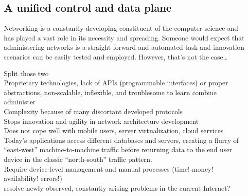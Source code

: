 \newpage
\subsection{A unified control and data plane}
Networking is a constantly developing constituent of the computer science and has played a vast role in its necessity and spreading.
Someone would expect that administering networks is a straight-forward and automated task and innovation scenarios can be easily tested and employed.
However, that's not the case\ldots \\
\indent 


Split those two
\\Proprietary technologies, lack of APIs (programmable interfaces) or proper abstractions, non-scalable, inflexible, and troublesome to learn combine administer
\\Complexity because of many discortant developed protocols
\\Stops innovation and agility in network architecture development
\\Does not cope well with mobile users, server virtualization, cloud services
\\Today’s applications access different databases and servers, creating a flurry of “east-west” machine-to-machine traffic before returning data to the end user device in the classic “north-south” traffic pattern.
\\Require device-level management and manual processes (time! money! availability! errors!)
\\resolve newly observed, constantly arising problems in the current Internet?